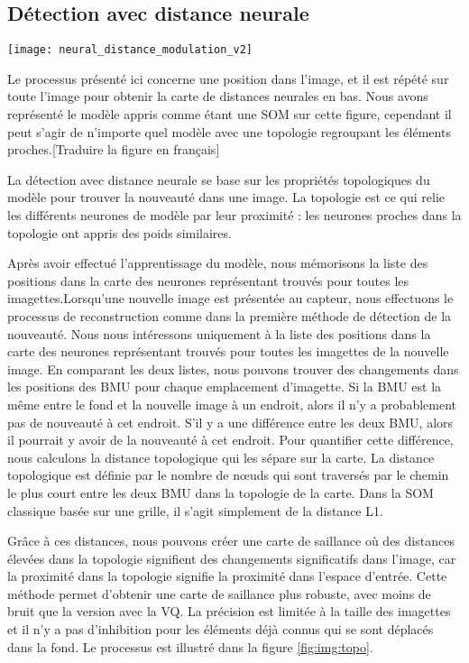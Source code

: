 	\subsection{Détection avec distance neurale}

	\begin{figureth}
		\texttt{[image: neural\_distance\_modulation\_v2]}
		\caption[Détection de nouveauté avec topologie]{Le processus présenté ici concerne une position dans l'image, et il est répété sur toute l'image pour obtenir la carte de distances neurales en bas. Nous avons représenté le modèle appris comme étant une SOM sur cette figure, cependant il peut s'agir de n'importe quel modèle avec une topologie regroupant les éléments proches.[Traduire la figure en français]}\label{fig:img:topo}
	\end{figureth}

	La détection avec distance neurale se base sur les propriétés topologiques du modèle pour trouver la nouveauté dans une image. La topologie est ce qui relie les différents neurones de modèle par leur proximité : les neurones proches dans la topologie ont appris des poids similaires.

	Après avoir effectué l'apprentissage du modèle, nous mémorisons la liste des positions dans la carte des neurones représentant trouvés pour toutes les imagettes.Lorsqu'une nouvelle image est présentée au capteur, nous effectuons le processus de reconstruction comme dans la première méthode de détection de la nouveauté. Nous nous intéressons uniquement à la liste des positions dans la carte des neurones représentant trouvés pour toutes les imagettes de la nouvelle image. En comparant les deux listes, nous pouvons trouver des changements dans les positions des BMU pour chaque emplacement d'imagette. Si la BMU est la même entre le fond et la nouvelle image à un endroit, alors il n'y a probablement pas de nouveauté à cet endroit. S'il y a une différence entre les deux BMU, alors il pourrait y avoir de la nouveauté à cet endroit. Pour quantifier cette différence, nous calculons la distance topologique qui les sépare sur la carte. La distance topologique est définie par le nombre de nœuds qui sont traversés par le chemin le plus court entre les deux BMU dans la topologie de la carte. Dans la SOM classique basée sur une grille, il s'agit simplement de la distance L1.

	Grâce à ces distances, nous pouvons créer une carte de saillance où des distances élevées dans la topologie signifient des changements significatifs dans l'image, car la proximité dans la topologie signifie la proximité dans l'espace d'entrée. Cette méthode permet d'obtenir une carte de saillance plus robuste, avec moins de bruit que la version avec la VQ. La précision est limitée à la taille des imagettes et il n'y a pas d'inhibition pour les éléments déjà connus qui se sont déplacés dans la fond. Le processus est illustré dans la figure \ref{fig:img:topo}.

